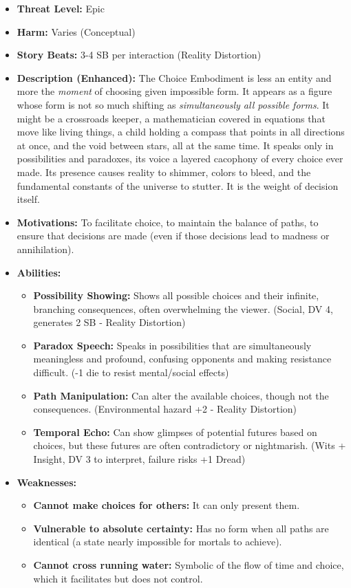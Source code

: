 \documentclass[11pt]{article}
\begin{document}
\begin{itemize}
\item \textbf{Threat Level:} Epic
\item \textbf{Harm:} Varies (Conceptual)
\item \textbf{Story Beats:} 3-4 SB per interaction (Reality Distortion)
\item \textbf{Description (Enhanced):} The Choice Embodiment is less an entity and more the \textit{moment} of choosing given impossible form. It appears as a figure whose form is not so much shifting as \textit{simultaneously all possible forms}. It might be a crossroads keeper, a mathematician covered in equations that move like living things, a child holding a compass that points in all directions at once, and the void between stars, all at the same time. It speaks only in possibilities and paradoxes, its voice a layered cacophony of every choice ever made. Its presence causes reality to shimmer, colors to bleed, and the fundamental constants of the universe to stutter. It is the weight of decision itself.
\item \textbf{Motivations:} To facilitate choice, to maintain the balance of paths, to ensure that decisions are made (even if those decisions lead to madness or annihilation).
\item \textbf{Abilities:}
\begin{itemize}
\item \textbf{Possibility Showing:} Shows all possible choices and their infinite, branching consequences, often overwhelming the viewer. (Social, DV 4, generates 2 SB - Reality Distortion)
\item \textbf{Paradox Speech:} Speaks in possibilities that are simultaneously meaningless and profound, confusing opponents and making resistance difficult. (-1 die to resist mental/social effects)
\item \textbf{Path Manipulation:} Can alter the available choices, though not the consequences. (Environmental hazard +2 - Reality Distortion)
\item \textbf{Temporal Echo:} Can show glimpses of potential futures based on choices, but these futures are often contradictory or nightmarish. (Wits + Insight, DV 3 to interpret, failure risks +1 Dread)
\end{itemize}
\item \textbf{Weaknesses:}
\begin{itemize}
\item \textbf{Cannot make choices for others:} It can only present them.
\item \textbf{Vulnerable to absolute certainty:} Has no form when all paths are identical (a state nearly impossible for mortals to achieve).
\item \textbf{Cannot cross running water:} Symbolic of the flow of time and choice, which it facilitates but does not control.
\end{itemize}
\end{itemize}
\end{document}
